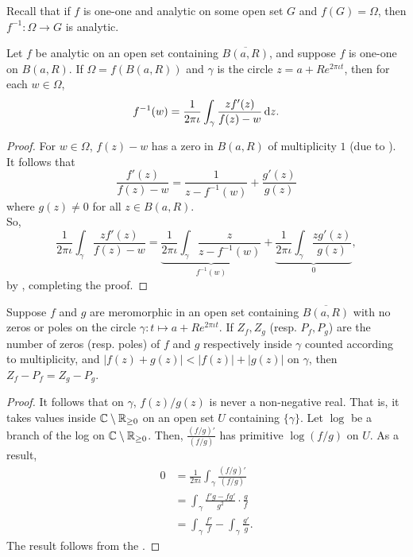 	Recall that if $f$ is one-one and analytic on some open set $G$ and $f(G) = \Omega$, then $f^{-1} : \Omega \to G$ is analytic.


	\begin{prop}
		Let $f$ be analytic on an open set containing $\overline{B(a,R)}$, and suppose $f$ is one-one on $B(a,R)$. If $\Omega = f(B(a,R))$ and $\gamma$ is the circle $z = a+Re^{2\pi\iota t}$, then for each $w \in \Omega$,
		\[ f^{-1}(w) = \frac{1}{2\pi\iota} \int_{\gamma} \frac{zf'(z)}{f(z)-w} \dif z. \]
	\end{prop}
	\begin{proof}
		For $w \in \Omega$, $f(z) - w$ has a zero in $B(a,R)$ of multiplicity $1$ (due to ). It follows that
		\[ \frac{f'(z)}{f(z)-w} = \frac{1}{z-f^{-1}(w)} + \frac{g'(z)}{g(z)} \]
		where $g(z) \ne 0$ for all $z \in B(a,R)$.\\
		So,
		\[ \frac{1}{2\pi\iota} \int_{\gamma} \frac{zf'(z)}{f(z)-w} = \underbrace{\frac{1}{2\pi\iota}\int_{\gamma} \frac{z}{z-f^{-1}(w)}}_{f^{-1}(w)} + \underbrace{\frac{1}{2\pi\iota} \int_{\gamma} \frac{zg'(z)}{g(z)}}_{0}, \]
		by , completing the proof.
	\end{proof}


	\begin{ftheo}
		Suppose $f$ and $g$ are meromorphic in an open set containing $\overline{B(a,R)}$ with no zeros or poles on the circle $\gamma: t \mapsto a+Re^{2\pi\iota t}$. If $Z_f,Z_g$ (resp. $P_f,P_g$) are the number of zeros (resp. poles) of $f$ and $g$ respectively inside $\gamma$ counted according to multiplicity, and  $|f(z) + g(z)| < |f(z)| + |g(z)|$ on $\gamma$, then $Z_f - P_f = Z_g - P_g$.
	\end{ftheo}
	\begin{proof}
		It follows that on $\gamma$, $f(z)/g(z)$ is never a non-negative real. That is, it takes values inside $\mathbb{C} \setminus \mathbb{R}_{\ge 0}$ on an open set $U$ containing $\{\gamma\}$. Let $\log$ be a branch of the log on $\mathbb{C} \setminus \mathbb{R}_{\ge 0}$. Then, $\frac{(f/g)'}{(f/g)}$ has primitive $\log(f/g)$ on $U$. As a result,
		\begin{align*}
			0 &= \frac{1}{2\pi\iota} \int_{\gamma} \frac{(f/g)'}{(f/g)} \\
				&= \int_{\gamma} \frac{f'g - fg'}{g^2} \cdot \frac{g}{f} \\
				&= \int_{\gamma} \frac{f'}{f} - \int_{\gamma} \frac{g'}{g}.
		\end{align*} 
		The result follows from the .
	\end{proof}